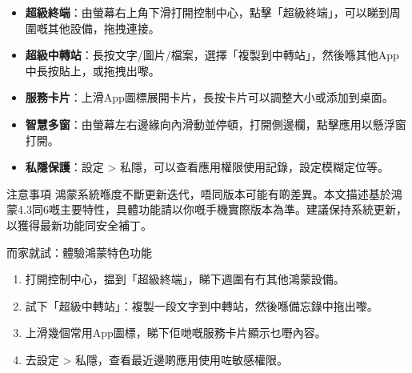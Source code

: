 
\begin{itemize}
  \item \textbf{超級終端}：由螢幕右上角下滑打開控制中心，點擊「超級終端」，可以睇到周圍嘅其他設備，拖拽連接。
  \item \textbf{超級中轉站}：長按文字/圖片/檔案，選擇「複製到中轉站」，然後喺其他App中長按貼上，或拖拽出嚟。
  \item \textbf{服務卡片}：上滑App圖標展開卡片，長按卡片可以調整大小或添加到桌面。
  \item \textbf{智慧多窗}：由螢幕左右邊緣向內滑動並停頓，打開側邊欄，點擊應用以懸浮窗打開。
  \item \textbf{私隱保護}：設定 > 私隱，可以查看應用權限使用記錄，設定模糊定位等。
\end{itemize}

\begin{tcbwarn}{注意事項}
鴻蒙系統喺度不斷更新迭代，唔同版本可能有啲差異。本文描述基於鴻蒙4.3同6嘅主要特性，具體功能請以你嘅手機實際版本為準。建議保持系統更新，以獲得最新功能同安全補丁。

\end{tcbwarn}

\begin{tcbpractice}{而家就試：體驗鴻蒙特色功能}
\begin{enumerate}
  \item 打開控制中心，揾到「超級終端」，睇下週圍有冇其他鴻蒙設備。
  \item 試下「超級中轉站」：複製一段文字到中轉站，然後喺備忘錄中拖出嚟。
  \item 上滑幾個常用App圖標，睇下佢哋嘅服務卡片顯示乜嘢內容。
  \item 去設定 > 私隱，查看最近邊啲應用使用咗敏感權限。
\end{enumerate}

\end{tcbpractice}
